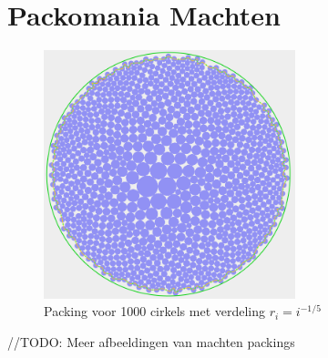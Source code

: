 \documentclass[12pt,a4paper,oneside]{book}
\begin{document}
\section{Packomania Machten}

\begin{figure}
  \centering
  \includegraphics[width=0.65\textwidth]{packing-neg1div5-1000.png}
  \caption{Packing voor 1000 cirkels met verdeling $r_i=i^{-1/5}$} \label{fig:packing-neg1div5-1000} 
\end{figure}

//TODO: Meer afbeeldingen van machten packings





\newpage
\end{document}
